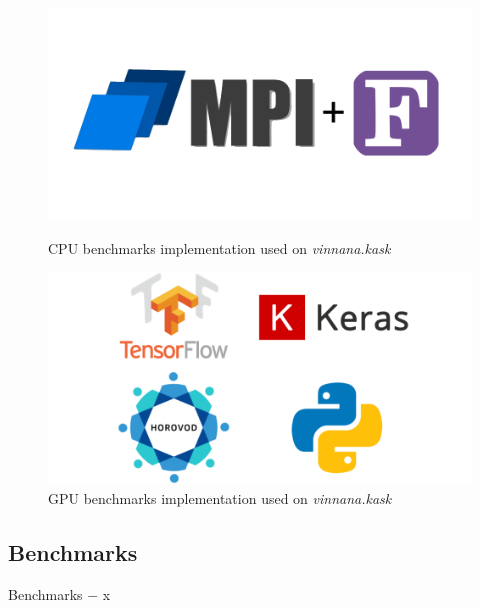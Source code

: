 \begin{figure}[hbt!]
    \centering
    \captionsetup{width=.46\linewidth}
    \begin{minipage}[t]{0.46\textwidth}
        \includegraphics[width=\textwidth]{figures/implementations/MPI-Fortran_logo.png}
        \caption{CPU benchmarks implementation used on \emph{vinnana.kask}}\label{fig:cpus_implementation_vinnana.kask}
    \end{minipage}
    \hspace{1cm}
    \centering
    \captionsetup{width=.46\linewidth}
    \begin{minipage}[t]{0.46\textwidth}
        \includegraphics[width=\textwidth]{figures/implementations/Horovod-Python_logo.png}
        \caption{GPU benchmarks implementation used on \emph{vinnana.kask}}\label{fig:gpus_implementation_vinnana.kask}
    \end{minipage}
\end{figure}



\newpage

\subsection{Benchmarks}
Benchmarks $-$ x

